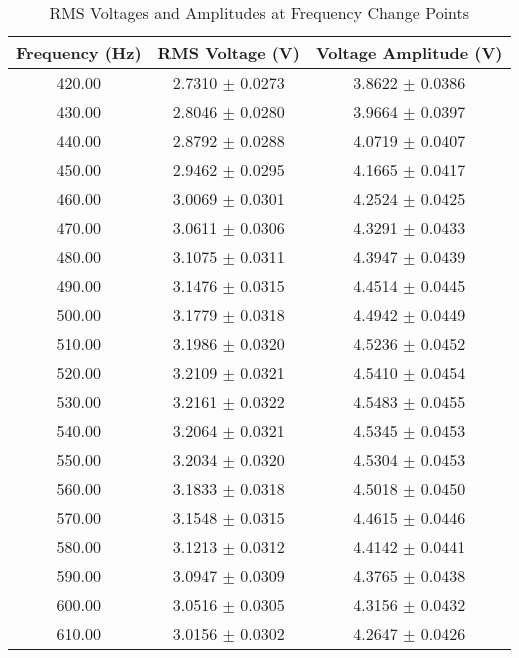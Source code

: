 
\begin{table}[h]
\centering
\begin{tabular}{|c|c|c|}
\hline
Frequency (Hz) & RMS Voltage (V) & Voltage Amplitude (V) \\
\hline
420.00 & 2.7310 $\pm$ 0.0273 & 3.8622 $\pm$ 0.0386 \\
430.00 & 2.8046 $\pm$ 0.0280 & 3.9664 $\pm$ 0.0397 \\
440.00 & 2.8792 $\pm$ 0.0288 & 4.0719 $\pm$ 0.0407 \\
450.00 & 2.9462 $\pm$ 0.0295 & 4.1665 $\pm$ 0.0417 \\
460.00 & 3.0069 $\pm$ 0.0301 & 4.2524 $\pm$ 0.0425 \\
470.00 & 3.0611 $\pm$ 0.0306 & 4.3291 $\pm$ 0.0433 \\
480.00 & 3.1075 $\pm$ 0.0311 & 4.3947 $\pm$ 0.0439 \\
490.00 & 3.1476 $\pm$ 0.0315 & 4.4514 $\pm$ 0.0445 \\
500.00 & 3.1779 $\pm$ 0.0318 & 4.4942 $\pm$ 0.0449 \\
510.00 & 3.1986 $\pm$ 0.0320 & 4.5236 $\pm$ 0.0452 \\
520.00 & 3.2109 $\pm$ 0.0321 & 4.5410 $\pm$ 0.0454 \\
530.00 & 3.2161 $\pm$ 0.0322 & 4.5483 $\pm$ 0.0455 \\
540.00 & 3.2064 $\pm$ 0.0321 & 4.5345 $\pm$ 0.0453 \\
550.00 & 3.2034 $\pm$ 0.0320 & 4.5304 $\pm$ 0.0453 \\
560.00 & 3.1833 $\pm$ 0.0318 & 4.5018 $\pm$ 0.0450 \\
570.00 & 3.1548 $\pm$ 0.0315 & 4.4615 $\pm$ 0.0446 \\
580.00 & 3.1213 $\pm$ 0.0312 & 4.4142 $\pm$ 0.0441 \\
590.00 & 3.0947 $\pm$ 0.0309 & 4.3765 $\pm$ 0.0438 \\
600.00 & 3.0516 $\pm$ 0.0305 & 4.3156 $\pm$ 0.0432 \\
610.00 & 3.0156 $\pm$ 0.0302 & 4.2647 $\pm$ 0.0426 \\
\hline
\end{tabular}
\caption{RMS Voltages and Amplitudes at Frequency Change Points}
\label{tab:voltage_measurements}
\end{table}
